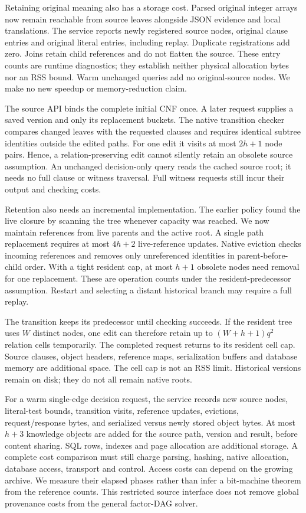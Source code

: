 \documentclass[11pt,a4paper]{article}
\numberwithin{equation}{section}
\theoremstyle{plain}
\theoremstyle{definition}
\theoremstyle{remark}
\begin{document}
Retaining original meaning also has a storage cost. Parsed original integer arrays now remain reachable from source leaves alongside JSON evidence and local translations. The service reports newly registered source nodes, original clause entries and original literal entries, including replay. Duplicate registrations add zero. Joins retain child references and do not flatten the source. These entry counts are runtime diagnostics; they establish neither physical allocation bytes nor an RSS bound. Warm unchanged queries add no original-source nodes. We make no new speedup or memory-reduction claim.

The source API binds the complete initial CNF once. A later request supplies a saved version and only its replacement buckets. The native transition checker compares changed leaves with the requested clauses and requires identical subtree identities outside the edited paths. For one edit it visits at most $2h+1$ node pairs. Hence, a relation-preserving edit cannot silently retain an obsolete source assumption. An unchanged decision-only query reads the cached source root; it needs no full clause or witness traversal. Full witness requests still incur their output and checking costs.

Retention also needs an incremental implementation. The earlier policy found the live closure by scanning the tree whenever capacity was reached. We now maintain references from live parents and the active root. A single path replacement requires at most $4h+2$ live-reference updates. Native eviction checks incoming references and removes only unreferenced identities in parent-before-child order. With a tight resident cap, at most $h+1$ obsolete nodes need removal for one replacement. These are operation counts under the resident-predecessor assumption. Restart and selecting a distant historical branch may require a full replay.

The transition keeps its predecessor until checking succeeds. If the resident tree uses $W$ distinct nodes, one edit can therefore retain up to $(W+h+1)q^2$ relation cells temporarily. The completed request returns to its resident cell cap. Source clauses, object headers, reference maps, serialization buffers and database memory are additional space. The cell cap is not an RSS limit. Historical versions remain on disk; they do not all remain native roots.

For a warm single-edge decision request, the service records new source nodes, literal-test bounds, transition visits, reference updates, evictions, request/response bytes, and serialized versus newly stored object bytes. At most $h+3$ knowledge objects are added for the source path, version and result, before content sharing. SQL rows, indexes and page allocation are additional storage. A complete cost comparison must still charge parsing, hashing, native allocation, database access, transport and control. Access costs can depend on the growing archive. We measure their elapsed phases rather than infer a bit-machine theorem from the reference counts. This restricted source interface does not remove global provenance costs from the general factor-DAG solver.
\end{document}
